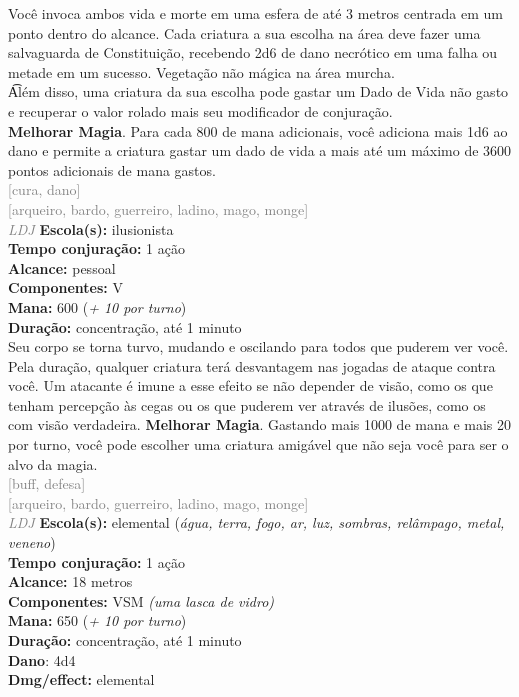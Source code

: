 \documentclass{RPG_Adventure}[2021/10/20]
\begin{document}
{\normalsize Você invoca ambos vida e morte em uma esfera de até 3 metros centrada em um ponto dentro do alcance. Cada criatura a sua escolha na área deve fazer uma salvaguarda de Constituição, recebendo 2d6 de dano necrótico em uma falha ou metade em um sucesso. Vegetação não mágica na área murcha.\\\t Além disso, uma criatura da sua escolha pode gastar um Dado de Vida não gasto e recuperar o valor rolado mais seu modificador de conjuração.\\\t \textbf{Melhorar Magia}. Para cada 800 de mana adicionais, você adiciona mais 1d6 ao dano e permite a criatura gastar um dado de vida a mais até um máximo de 3600 pontos adicionais de mana gastos.\\}
{\scriptsize \textcolor{gray}{[cura, dano]\\}}
{\scriptsize \textcolor{gray}{[arqueiro, bardo, guerreiro, ladino, mago, monge]\\}}
{\tiny \textcolor{gray}{\textit{LDJ}}}\jump{}
{\small \t \textbf{Escola(s):} ilusionista\\\t \textbf{Tempo conjuração:} 1 ação\\\t \textbf{Alcance:} pessoal\\\t \textbf{Componentes:} V\\\t \textbf{Mana:} 600 (\textit{+ 10 por turno})\\\t \textbf{Duração:} concentração, até 1 minuto\\}
{\normalsize Seu corpo se torna turvo, mudando e oscilando para todos que puderem ver você. Pela duração, qualquer criatura terá desvantagem nas jogadas de ataque contra você. Um atacante é imune a esse efeito se não depender de visão, como os que tenham percepção às cegas ou os que puderem ver através de ilusões, como os com visão verdadeira. \textbf{Melhorar Magia}. Gastando mais 1000 de mana e mais 20 por turno, você pode escolher uma criatura amigável que não seja você para ser o alvo da magia.\\}
{\scriptsize \textcolor{gray}{[buff, defesa]\\}}
{\scriptsize \textcolor{gray}{[arqueiro, bardo, guerreiro, ladino, mago, monge]\\}}
{\tiny \textcolor{gray}{\textit{LDJ}}}\jump{}
{\small \t \textbf{Escola(s):} elemental (\textit{água, terra, fogo, ar, luz, sombras, relâmpago, metal, veneno})\\\t \textbf{Tempo conjuração:} 1 ação\\\t \textbf{Alcance:} 18 metros\\\t \textbf{Componentes:} VSM \textit{(uma lasca de vidro)}\\\t \textbf{Mana:} 650 (\textit{+ 10 por turno})\\\t \textbf{Duração:} concentração, até 1 minuto\\\t \textbf{Dano}: 4d4\\\t \textbf{Dmg/effect:} elemental\\}
\end{document}
